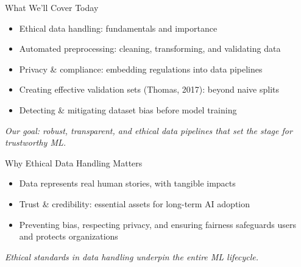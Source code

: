 \documentclass[aspectratio=169]{beamer}
\begin{document}
\begin{frame}{What We’ll Cover Today}
\begin{itemize}
\item Ethical data handling: fundamentals and importance
\item Automated preprocessing: cleaning, transforming, and validating data
\item Privacy \& compliance: embedding regulations into data pipelines
\item Creating effective validation sets (Thomas, 2017): beyond naive splits
\item Detecting \& mitigating dataset bias before model training
\end{itemize}

\emph{Our goal: robust, transparent, and ethical data pipelines that set the stage for trustworthy ML.}
\end{frame}


\begin{frame}{Why Ethical Data Handling Matters}
\begin{itemize}
\item Data represents real human stories, with tangible impacts
\item Trust \& credibility: essential assets for long-term AI adoption
\item Preventing bias, respecting privacy, and ensuring fairness safeguards users and protects organizations
\end{itemize}

\emph{Ethical standards in data handling underpin the entire ML lifecycle.}
\end{frame}
\end{document}
